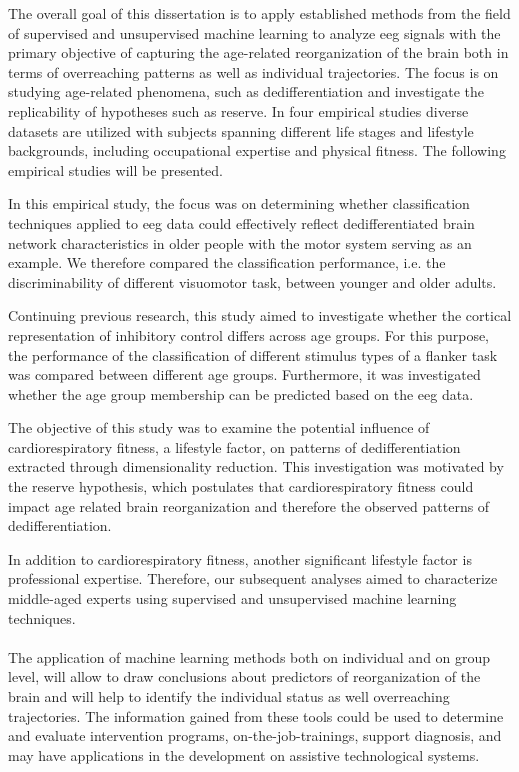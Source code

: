 The overall goal of this dissertation is to apply established methods from the field of supervised and unsupervised machine learning to analyze \gls{eeg} signals with the primary objective of capturing the age-related reorganization of the brain both in terms of overreaching patterns as well as individual trajectories. The focus is on studying age-related phenomena, such as dedifferentiation and investigate the replicability of hypotheses such as reserve. In four empirical studies diverse datasets are utilized with subjects spanning different life stages and lifestyle backgrounds, including occupational expertise and physical fitness. The following empirical studies will be presented.
\begin{quote}
\end{quote}
In this empirical study, the focus was on determining whether classification techniques applied to \gls{eeg} data could effectively reflect dedifferentiated brain network characteristics in older people with the motor system serving as an example. We therefore compared the classification performance, i.e. the discriminability of different visuomotor task, between younger and older adults.

\begin{quote}
\end{quote}
Continuing previous research, this study aimed to investigate whether the cortical representation of inhibitory control differs across age groups. For this purpose, the performance of the classification of different stimulus types of a flanker task was compared between different age groups. Furthermore, it was investigated whether the age group membership can be predicted based on the \gls{eeg} data.

\begin{quote}
\end{quote}
The objective of this study was to examine the potential influence of cardiorespiratory fitness, a lifestyle factor, on patterns of dedifferentiation extracted through dimensionality reduction. This investigation was motivated by the reserve hypothesis, which postulates that cardiorespiratory fitness could impact age related brain reorganization and therefore the observed patterns of dedifferentiation.

\begin{quote}
\end{quote}
In addition to cardiorespiratory fitness, another significant lifestyle factor is professional expertise. Therefore, our subsequent analyses aimed to characterize middle-aged experts using supervised and unsupervised machine learning techniques.\\
\\
The application of machine learning methods both on individual and on group level, will allow to draw conclusions about predictors of reorganization of the brain and will help to identify the individual status as well overreaching trajectories. The information gained from these tools could be used to determine and evaluate intervention programs, on-the-job-trainings, support diagnosis, and may have applications in the development on assistive technological systems. 